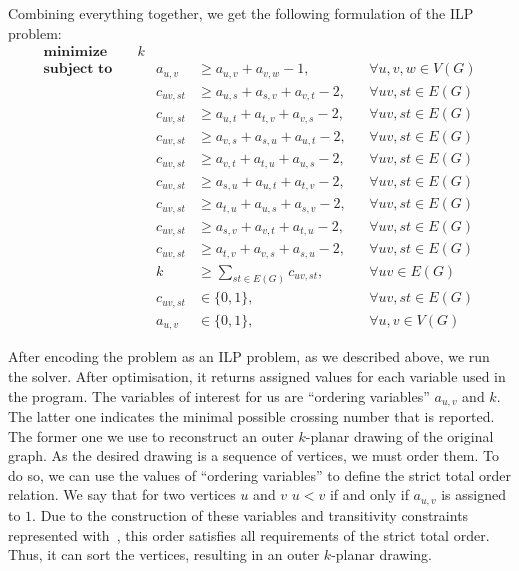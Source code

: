Combining everything together, we get the following formulation of the ILP problem:
\begin{align}
    \textbf{minimize}\quad&k  \label{eq:ilp:objective}\\
    \textbf{subject to}\quad
    &&a_{u, v} &\geqslant a_{u, v} + a_{v, w} - 1,&&\forall u, v, w \in V(G)  \label{eq:ilp:con:transitivity}\\
    &&c_{uv, st} &\geqslant a_{u,s} + a_{s,v} + a_{v,t} - 2,&&\forall uv, st \in E(G)  \label{eq:ilp:con:cross-example}\\
    &&c_{uv, st} &\geqslant a_{u,t} + a_{t,v} + a_{v,s} - 2,&&\forall uv, st \in E(G) \label{eq:ilp:con:cross-begin}\\
    &&c_{uv, st} &\geqslant a_{v,s} + a_{s,u} + a_{u,t} - 2,&&\forall uv, st \in E(G)\\
    &&c_{uv, st} &\geqslant a_{v,t} + a_{t,u} + a_{u,s} - 2,&&\forall uv, st \in E(G)\\
    &&c_{uv, st} &\geqslant a_{s,u} + a_{u,t} + a_{t,v} - 2,&&\forall uv, st \in E(G)\\
    &&c_{uv, st} &\geqslant a_{t,u} + a_{u,s} + a_{s,v} - 2,&&\forall uv, st \in E(G)\\
    &&c_{uv, st} &\geqslant a_{s,v} + a_{v,t} + a_{t,u} - 2,&&\forall uv, st \in E(G)\\
    &&c_{uv, st} &\geqslant a_{t,v} + a_{v,s} + a_{s,u} - 2,&&\forall uv, st \in E(G)  \label{eq:ilp:con:cross-end}\\
    &&k &\geqslant \sum_{st \in E(G)} c_{uv, st},&&\forall uv \in E(G)  \label{eq:ilp:con:crossing-number}\\
    &&c_{uv, st} &\in \{0, 1\},&&\forall uv, st \in E(G)  \label{eq:ilp:con:cross-var}\\
    &&a_{u, v} &\in \{0, 1\},&&\forall u, v \in V(G)  \label{eq:ilp:con:order-var}
\end{align}

After encoding the problem as an ILP problem, as we described above, we run the solver. After optimisation, it returns assigned values for each variable used in the program. The variables of interest for us are ``ordering variables'' \(a_{u, v}\) and \(k\). The latter one indicates the minimal possible crossing number that is reported. The former one we use to reconstruct an outer \(k\)-planar drawing of the original graph. As the desired drawing is a sequence of vertices, we must order them. To do so, we can use the values of ``ordering variables'' to define the strict total order relation. We say that for two vertices \(u\) and \(v\) \(u < v\) if and only if \(a_{u, v}\) is assigned to \(1\). Due to the construction of these variables and transitivity constraints represented with~, this order satisfies all requirements of the strict total order. Thus, it can sort the vertices, resulting in an outer \(k\)-planar drawing.


